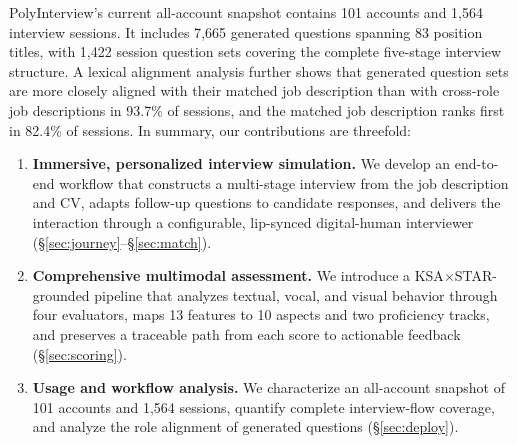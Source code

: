 \documentclass[11pt]{article}
\begin{document}
PolyInterview's current all-account snapshot contains 101 accounts and 1{,}564 interview sessions. It includes 7{,}665 generated questions spanning 83 position titles, with 1{,}422 session question sets covering the complete five-stage interview structure. A lexical alignment analysis further shows that generated question sets are more closely aligned with their matched job description than with cross-role job descriptions in 93.7\% of sessions, and the matched job description ranks first in 82.4\% of sessions. In summary, our contributions are threefold:
\begin{enumerate}[noitemsep,topsep=2pt,leftmargin=*]
  \item \textbf{Immersive, personalized interview simulation.} We develop an end-to-end workflow that constructs a multi-stage interview from the job description and CV, adapts follow-up questions to candidate responses, and delivers the interaction through a configurable, lip-synced digital-human interviewer (\S\ref{sec:journey}--\S\ref{sec:match}).
  \item \textbf{Comprehensive multimodal assessment.} We introduce a KSA$\times$STAR-grounded pipeline that analyzes textual, vocal, and visual behavior through four evaluators, maps 13 features to 10 aspects and two proficiency tracks, and preserves a traceable path from each score to actionable feedback (\S\ref{sec:scoring}).
  \item \textbf{Usage and workflow analysis.} We characterize an all-account snapshot of 101 accounts and 1{,}564 sessions, quantify complete interview-flow coverage, and analyze the role alignment of generated questions (\S\ref{sec:deploy}).
\end{enumerate}
\end{document}
